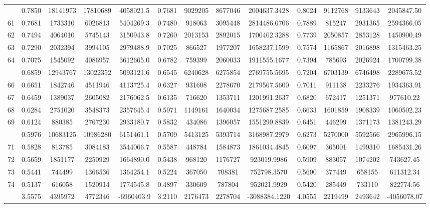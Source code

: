 \documentclass[
  12pt,
]{article}
\begin{document}
\begin{longtable}[t]{lcccccccccccc}
\addlinespace
60 & 0.7850 & 18141973 & 17810689 & 4058021.5 & 0.7681 & 9029205 & 8677046 & 2004637.3428 & 0.8024 & 9112768 & 9133643 & 2045847.50\\
61 & 0.7681 & 1733310 & 6026813 & 5404269.3 & 0.7480 & 918063 & 3095448 & 2814486.6706 & 0.7889 & 815247 & 2931365 & 2594366.05\\
62 & 0.7494 & 4064010 & 5745143 & 3150943.8 & 0.7260 & 2013153 & 2892015 & 1700402.3288 & 0.7739 & 2050857 & 2853128 & 1450900.49\\
63 & 0.7290 & 2032394 & 3994105 & 2979488.9 & 0.7025 & 866527 & 1977207 & 1658237.1599 & 0.7574 & 1165867 & 2016898 & 1315463.25\\
64 & 0.7075 & 1545092 & 4086957 & 3612665.0 & 0.6782 & 759399 & 2060033 & 1911555.1677 & 0.7394 & 785693 & 2026924 & 1700799.38\\
\addlinespace
65 & 0.6859 & 12943767 & 13022352 & 5093121.6 & 0.6545 & 6240628 & 6275854 & 2769755.5695 & 0.7204 & 6703139 & 6746498 & 2289675.52\\
66 & 0.6651 & 1842746 & 4511946 & 4113725.4 & 0.6327 & 931608 & 2278670 & 2179567.5600 & 0.7011 & 911138 & 2233276 & 1934363.91\\
67 & 0.6459 & 1389037 & 2605082 & 2176062.5 & 0.6135 & 716620 & 1353711 & 1201991.2637 & 0.6820 & 672417 & 1251371 & 977610.22\\
68 & 0.6284 & 2751020 & 3548373 & 2357645.4 & 0.5971 & 1149161 & 1640034 & 1275687.2585 & 0.6633 & 1601859 & 1908339 & 1060502.23\\
69 & 0.6124 & 880385 & 2767230 & 2933180.7 & 0.5832 & 434086 & 1396057 & 1551299.8839 & 0.6451 & 446299 & 1371173 & 1381243.29\\
\addlinespace
70 & 0.5976 & 10683125 & 10986280 & 6151461.1 & 0.5709 & 5413125 & 5393714 & 3168987.2979 & 0.6273 & 5270000 & 5592566 & 2965996.15\\
71 & 0.5828 & 813785 & 3084183 & 3544066.7 & 0.5587 & 448784 & 1584873 & 1861034.4845 & 0.6097 & 365001 & 1499310 & 1685431.26\\
72 & 0.5659 & 1851177 & 2250929 & 1664890.0 & 0.5438 & 968120 & 1176727 & 923019.9986 & 0.5909 & 883057 & 1074202 & 743627.45\\
73 & 0.5441 & 744499 & 1366536 & 1364254.1 & 0.5224 & 367050 & 708381 & 752798.3570 & 0.5690 & 377449 & 658155 & 611312.34\\
74 & 0.5137 & 616058 & 1520914 & 1774545.8 & 0.4897 & 330609 & 787804 & 952021.9929 & 0.5420 & 285449 & 733110 & 822774.56\\
\addlinespace
75 & 3.5575 & 4395972 & 4772346 & -6960403.9 & 3.2110 & 2176473 & 2278704 & -3088384.1220 & 4.0555 & 2219499 & 2493642 & -4056078.07\\*
\end{longtable}
\endgroup{}
\end{document}
